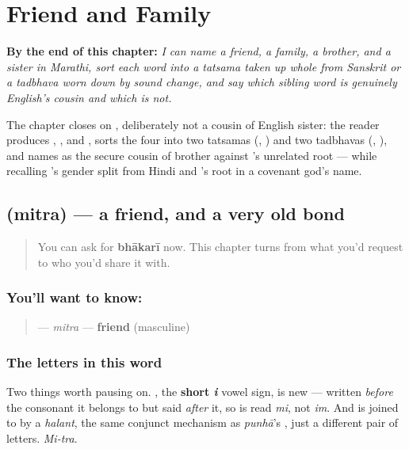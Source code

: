 
\chapter{Friend and Family}
\label{ch:mr-friend-and-family}

\begin{chapteropening}
\textbf{By the end of this chapter:} \emph{I can name a friend, a family, a brother, and a sister in Marathi, sort each word into a tatsama taken up whole from Sanskrit or a tadbhava worn down by sound change, and say which sibling word is genuinely English's cousin and which is not.}

The chapter closes on , deliberately not a cousin of English sister: the reader produces , ,  and , sorts the four into two tatsamas (, ) and two tadbhavas (, ), and names  as the secure cousin of brother against 's unrelated root — while recalling 's gender split from Hindi and 's root in a covenant god's name.
\end{chapteropening}

\section[mitra]{ (mitra) — a friend, and a very old bond}

\label{lesson:MR-C11-mitra}



\begin{quote}
You can ask for \textbf{bhākarī} now. This chapter turns from what you'd request to who you'd share it with.
\end{quote}

\subsection*{You'll want to know: }
\begin{quote}
\textbf{} — \emph{mitra} — \textbf{friend} (masculine)
\end{quote}

\subsection*{The letters in this word}
Two things worth pausing on. \textbf{}, the \textbf{short \emph{i}} vowel sign, is new — written \emph{before} the consonant it belongs to but said \emph{after} it, so \textbf{} is read \emph{mi}, not \emph{im}. And \textbf{} is \textbf{} joined to \textbf{} by a \emph{halant}, the same conjunct mechanism as \emph{punhā}'s \textbf{}, just a different pair of letters. \emph{Mi-tra}.

